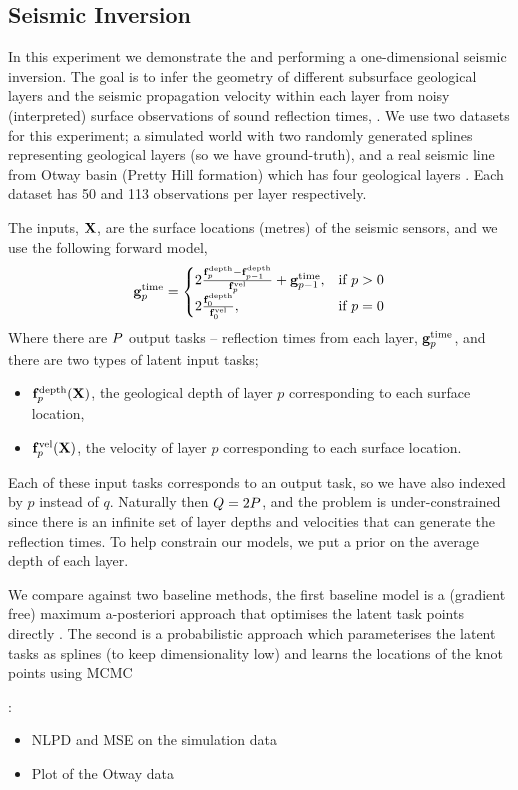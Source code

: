 \subsection{Seismic Inversion}

In this experiment we demonstrate the \eks and \uks performing a
one-dimensional seismic inversion. The goal is to infer the geometry of
different subsurface geological layers and the seismic propagation velocity
within each layer from noisy (interpreted) surface observations of sound
reflection times, \Outs. We use two datasets for this experiment; a simulated
world with two randomly generated splines representing geological layers (so we
have ground-truth), and a real seismic line from Otway basin (Pretty Hill
formation) which has four geological layers . Each dataset has 50
and 113 observations per layer respectively.

The inputs, $\mathbf{X}$, are the surface locations (metres) of the seismic sensors,
and we use the following forward model,
\begin{equation}
    \mathbf{g}_p^\text{time} =
    \begin{cases}
        2\frac{\mathbf{f}_p^\text{depth} - \mathbf{f}_{p-1}^\text{depth}}
        {\mathbf{f}_p^\text{vel}} + \mathbf{g}_{p-1}^\text{time},
        & \text{if } p > 0 \\
        2\frac{\mathbf{f}_0^\text{depth}}{\mathbf{f}_0^\text{vel}},
        & \text{if } p = 0
    \end{cases}
\end{equation}
Where there are $P$ output tasks -- reflection times from each layer,
$\mathbf{g}_p^\text{time}$, and there are two types of latent input tasks;
\begin{itemize}
    \item $\mathbf{f}_p^\text{depth}\!\left({\mathbf{X}}\right)$, the geological depth of layer
        $p$ corresponding to each surface location,
    \item $\mathbf{f}_p^\text{vel}\!\left({\mathbf{X}}\right)$, the velocity of layer $p$ 
        corresponding to each surface location.
\end{itemize}
Each of these input tasks corresponds to an output task, so we have also
indexed by $p$ instead of $q$. Naturally then $Q = 2P$, and the
problem is under-constrained since there is an infinite set of layer depths and
velocities that can generate the reflection times. To help constrain our
models, we put a prior on the average depth of each layer.

We compare against two baseline methods, the first baseline model is a
(gradient free) maximum a-posteriori approach that optimises the latent task
points directly . The second is a
probabilistic approach which parameterises the latent tasks as splines (to keep
dimensionality low) and learns the locations of the knot points using MCMC

:
\begin{itemize}
    \item NLPD and MSE on the simulation data
    \item Plot of the Otway data
\end{itemize}
